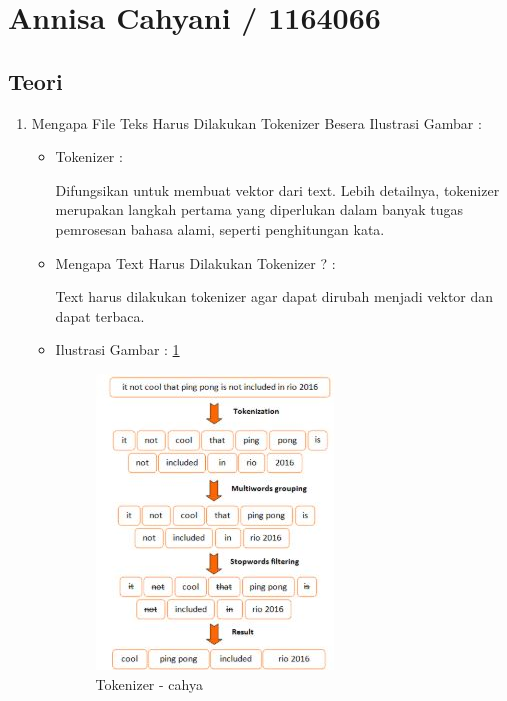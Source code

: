 \section{Annisa Cahyani / 1164066}
\subsection{Teori}
\begin{enumerate}
\item Mengapa File Teks Harus Dilakukan Tokenizer Besera Ilustrasi Gambar :
\begin{itemize}
\item Tokenizer :
\par Difungsikan untuk membuat vektor dari text. Lebih detailnya, tokenizer merupakan langkah pertama yang diperlukan dalam banyak tugas pemrosesan bahasa alami, seperti penghitungan kata.
\par
\par
\item Mengapa Text Harus Dilakukan Tokenizer ? :
\par Text harus dilakukan tokenizer agar dapat dirubah menjadi vektor dan dapat terbaca.
\par
\par
\item Ilustrasi Gambar : \ref{chapter-7-no-1-cahya}
\par
\begin{figure}[!hbtp]
\centering
\includegraphics[scale=0.2]{figures/Chapter 7/1164066/Teori/chapter-7-no-1-cahya.jpg}
\caption{Tokenizer - cahya}
\label{chapter-7-no-1-cahya}
\end{figure}
\par
\end{itemize}
\par
\par

\end{enumerate}
